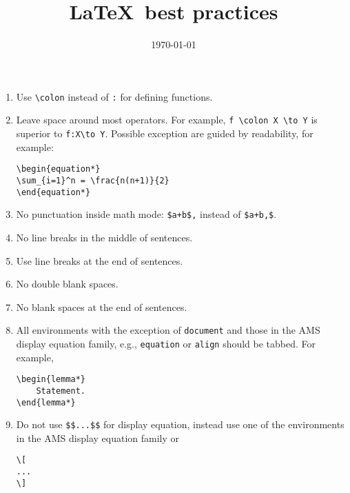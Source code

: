 \documentclass{article}
\begin{document}
	\title{\LaTeX\, best practices}
	\date{\today}
	\maketitle
	
	\begin{enumerate}
		\item Use \verb|\colon| instead of \verb|:| for defining functions.
		\item Leave space around most operators.
		For example, \verb|f \colon X \to Y| is superior to \verb|f:X\to Y|.
		Possible exception are guided by readability, for example:
		
		\verb|\begin{equation*}| \\
		\verb|\sum_{i=1}^n = \frac{n(n+1)}{2}| \\
		\verb|\end{equation*}|
		
		\item No punctuation inside math mode: \verb|$a+b$,| instead of \verb|$a+b,$|.
		\item No line breaks in the middle of sentences.
		\item Use line breaks at the end of sentences.
		\item No double blank spaces.
		\item No blank spaces at the end of sentences.
		\item All environments with the exception of \verb|document| and those in the AMS display equation family, e.g., \verb|equation| or \verb|align| should be tabbed.
		For example,
		
		\verb|\begin{lemma*}| \\
		\verb|    Statement.| \\
		\verb|\end{lemma*}|
		
		\item Do not use \verb|$$...$$| for display equation, instead use one of the environments in the AMS display equation family or
		
		\verb|\[| \\
		\verb|...| \\
		\verb|\]|
	\end{enumerate}
\end{document}
